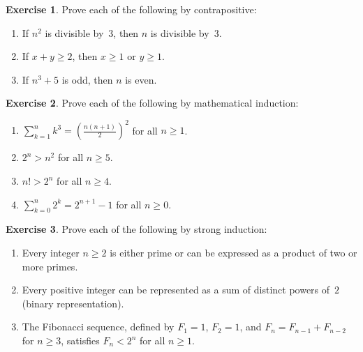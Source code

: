 \documentclass[12pt,a4paper,openany]{book}
\theoremstyle{definition}
\newtheorem{exercise}{Exercise}[chapter]
\theoremstyle{plain}
\theoremstyle{remark}
\begin{document}
\begin{exercise}
\label{exer:contrapositive-exercises}
Prove each of the following by contrapositive:
\begin{enumerate}[label=(\alph*),nosep]
  \item If $n^2$ is divisible by~$3$, then $n$ is divisible by~$3$.
  \item If $x + y \geq 2$, then $x \geq 1$ or $y \geq 1$.
  \item If $n^3 + 5$ is odd, then $n$ is even.
\end{enumerate}
\end{exercise}

\begin{exercise}
\label{exer:induction-exercises}
Prove each of the following by mathematical induction:
\begin{enumerate}[label=(\alph*),nosep]
  \item $\displaystyle\sum_{k=1}^{n} k^3 = \left(\frac{n(n+1)}{2}\right)^{\!2}$ for all $n \geq 1$.
  \item $2^n > n^2$ for all $n \geq 5$.
  \item $n! > 2^n$ for all $n \geq 4$.
  \item $\displaystyle\sum_{k=0}^{n} 2^k = 2^{n+1} - 1$ for all $n \geq 0$.
\end{enumerate}
\end{exercise}

\begin{exercise}
\label{exer:strong-induction-exercises}
Prove each of the following by strong induction:
\begin{enumerate}[label=(\alph*),nosep]
  \item Every integer $n \geq 2$ is either prime or can be expressed as a product of
        two or more primes.
  \item Every positive integer can be represented as a sum of distinct powers of~$2$
        (binary representation).
  \item The Fibonacci sequence, defined by $F_1 = 1$, $F_2 = 1$, and
        $F_n = F_{n-1} + F_{n-2}$ for $n \geq 3$, satisfies $F_n < 2^n$ for all
        $n \geq 1$.
\end{enumerate}
\end{exercise}
\end{document}
